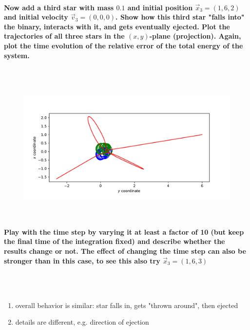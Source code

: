     \newpage
    \paragraph{Now add a third star with mass $0.1$ and initial position 
        $\vec x_3=(1,6,2)$ and initial velocity $\vec v_3=(0,0,0)$. Show how 
        this third star "falls into" the binary, interacts with it, and gets 
        eventually ejected. Plot the trajectories of all three stars in the 
        $(x,y)$-plane (projection). Again, plot the time evolution of the 
        relative error of the total energy of the system.
    } \ \\
        \\
        \begin{figure}[h!]
            \centering
            \includegraphics[width=\textwidth]{./figures/task2_3body.pdf}
            \caption{}
        \end{figure} \ \\ 
    
    \paragraph{Play with the time step by varying it at least a factor of 10 
        (but keep the final time of the integration fixed) and describe whether 
        the results change or not. The effect of changing the time step can 
        also be stronger than in this case, to see this also try 
        $\vec x_3=(1,6,3)$
    } \ \\
        \\
        \begin{enumerate}
            \item overall behavior is similar: star falls in, gets 
                "thrown around", then ejected
            \item details are different, e.g. direction of ejection
        \end{enumerate}

